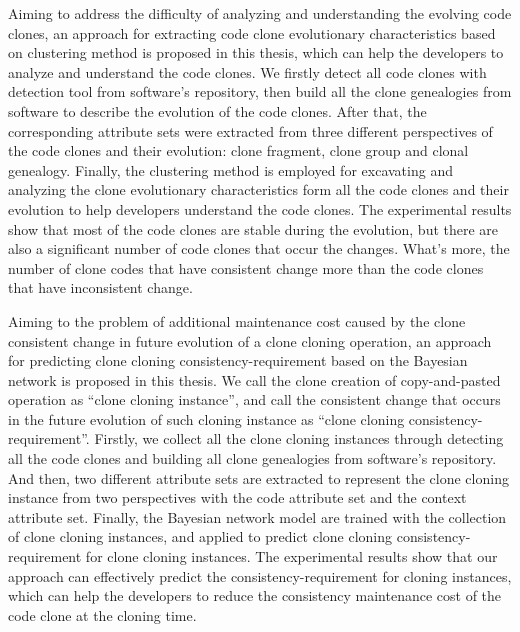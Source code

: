 {%
Aiming to address the difficulty of analyzing and understanding the evolving code clones, an  approach for extracting code clone evolutionary characteristics based on clustering method is proposed in this thesis, which can help the developers to analyze and understand the code clones. We firstly detect all code clones with detection tool from software's repository, then build all the clone genealogies from software to describe the evolution of the code clones. After that, the corresponding attribute sets were extracted from three different perspectives of the code clones and their evolution: clone fragment, clone group and clonal genealogy. Finally, the clustering method is employed for excavating and analyzing the clone evolutionary characteristics form all the code clones and their evolution to help developers understand the code clones. The experimental results show that most of the code clones are stable during the evolution, but there are also a significant number of code clones that occur the changes. What's more, the number of clone codes that have consistent change more than the code clones that have inconsistent change.

Aiming to the problem of additional maintenance cost caused by the clone consistent change in future evolution of a clone cloning operation, an approach for predicting clone cloning consistency-requirement based on the Bayesian network is proposed in this thesis. We call the clone creation of copy-and-pasted operation as ``clone cloning instance'', and call the consistent change that occurs in the future evolution of such cloning instance as ``clone cloning consistency-requirement''. Firstly, we collect all the clone cloning instances through detecting all the code clones and building all clone genealogies from software's repository. And then, two different attribute sets are extracted to represent the clone cloning instance from two perspectives with the code attribute set and the context attribute set. Finally, the Bayesian network model are trained with the collection of clone cloning instances, and applied to predict clone cloning consistency-requirement for clone cloning instances. The experimental results show that our approach can effectively predict the consistency-requirement for cloning instances, which can help the developers to reduce the consistency maintenance cost of the code clone at the cloning time.

}

